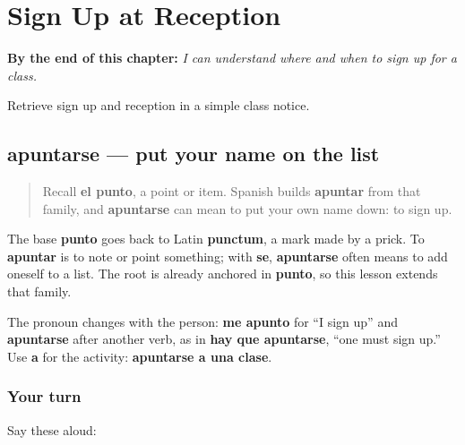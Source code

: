 
\chapter{Sign Up at Reception}
\label{ch:apuntarse-recepcion}

\begin{chapteropening}
\textbf{By the end of this chapter:} \emph{I can understand where and when to sign up for a class.}

Retrieve sign up and reception in a simple class notice.
\end{chapteropening}

\section[apuntarse]{apuntarse — put your name on the list}

\label{lesson:ES-C414-apuntarse}



\begin{quote}
Recall \textbf{el punto}, a point or item. Spanish builds \textbf{apuntar} from that family, and \textbf{apuntarse} can mean to put your own name down: to sign up.
\end{quote}

\begin{cousinweb}
The base \textbf{punto} goes back to Latin \textbf{punctum}, a mark made by a prick. To \textbf{apuntar} is to note or point something; with \textbf{se}, \textbf{apuntarse} often means to add oneself to a list. The root is already anchored in \textbf{punto}, so this lesson extends that family.
\end{cousinweb}

\begin{grammarlens}[title={Grammar Lens: who signs up?}]
The pronoun changes with the person: \textbf{me apunto} for “I sign up” and \textbf{apuntarse} after another verb, as in \textbf{hay que apuntarse}, “one must sign up.” Use \textbf{a} for the activity: \textbf{apuntarse a una clase}.
\end{grammarlens}

\subsection*{Your turn}
Say these aloud:

